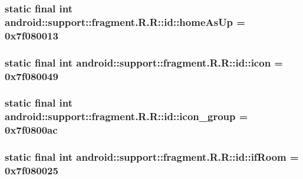 \hypertarget{classandroid_1_1support_1_1fragment_1_1_r_1_1id_dc3ef41025e46e02435ac37cc76875c9}{
\subsubsection[{homeAsUp}]{\setlength{\rightskip}{0pt plus 5cm}static final int android::support::fragment.R.R::id::homeAsUp = 0x7f080013}}
\label{classandroid_1_1support_1_1fragment_1_1_r_1_1id_dc3ef41025e46e02435ac37cc76875c9}


\hypertarget{classandroid_1_1support_1_1fragment_1_1_r_1_1id_522a9ba4e2fe821a07f1775a19446715}{
\subsubsection[{icon}]{\setlength{\rightskip}{0pt plus 5cm}static final int android::support::fragment.R.R::id::icon = 0x7f080049}}
\label{classandroid_1_1support_1_1fragment_1_1_r_1_1id_522a9ba4e2fe821a07f1775a19446715}


\hypertarget{classandroid_1_1support_1_1fragment_1_1_r_1_1id_e089251fa6bf6ebc028069675713e3f1}{
\subsubsection[{icon\_\-group}]{\setlength{\rightskip}{0pt plus 5cm}static final int android::support::fragment.R.R::id::icon\_\-group = 0x7f0800ac}}
\label{classandroid_1_1support_1_1fragment_1_1_r_1_1id_e089251fa6bf6ebc028069675713e3f1}


\hypertarget{classandroid_1_1support_1_1fragment_1_1_r_1_1id_6873d5276d0da31612ee07f7df3888a2}{
\subsubsection[{ifRoom}]{\setlength{\rightskip}{0pt plus 5cm}static final int android::support::fragment.R.R::id::ifRoom = 0x7f080025}}
\label{classandroid_1_1support_1_1fragment_1_1_r_1_1id_6873d5276d0da31612ee07f7df3888a2}


